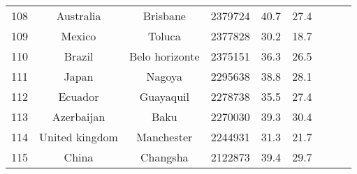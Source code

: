 \begin{table}
\begin{tabular}{ccccccccc}
 108 &           Australia &        Brisbane &    2379724 &     40.7 &     27.4 \\
 109 &              Mexico &          Toluca &    2377828 &     30.2 &     18.7 \\
 110 &              Brazil &  Belo horizonte &    2375151 &     36.3 &     26.5 \\
 111 &               Japan &          Nagoya &    2295638 &     38.8 &     28.1 \\
 112 &             Ecuador &       Guayaquil &    2278738 &     35.5 &     27.4 \\
 113 &          Azerbaijan &            Baku &    2270030 &     39.3 &     30.4 \\
 114 &      United kingdom &      Manchester &    2244931 &     31.3 &     21.7 \\
 115 &               China &        Changsha &    2122873 &     39.4 &     29.7 \\
\bottomrule
\end{tabular}
\end{table}
